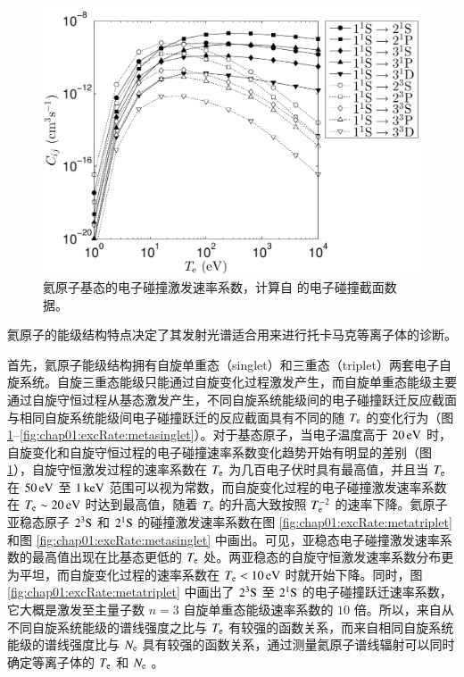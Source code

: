 \begin{figure}
  \centering
  \includegraphics[height=0.35\textheight]{excRate-from-1.pdf}
  \caption{氦原子基态的电子碰撞激发速率系数，计算自  的电子碰撞截面数据。}
  \label{fig:chap01:excRate:gs}
\end{figure}

氦原子的能级结构特点决定了其发射光谱适合用来进行托卡马克等离子体的诊断。

首先，氦原子能级结构拥有自旋单重态（singlet）和三重态（triplet）两套电子自旋系统。自旋三重态能级只能通过自旋变化过程激发产生，而自旋单重态能级主要通过自旋守恒过程从基态激发产生，不同自旋系统能级间的电子碰撞跃迁反应截面与相同自旋系统能级间电子碰撞跃迁的反应截面具有不同的随 $T_{\rm e}$ 的变化行为（图 \ref{fig:chap01:excRate:gs}--\ref{fig:chap01:excRate:metasinglet}）。对于基态原子，当电子温度高于 $20\,{\rm eV}$ 时，自旋变化和自旋守恒过程的电子碰撞速率系数变化趋势开始有明显的差别（图 \ref{fig:chap01:excRate:gs}），自旋守恒激发过程的速率系数在 $T_{\rm e}$ 为几百电子伏时具有最高值，并且当 $T_{\rm e}$ 在 $50\,{\rm eV}$ 至 $1\,{\rm keV}$ 范围可以视为常数，而自旋变化过程的电子碰撞激发速率系数在 $T_{\rm e}\sim 20\,{\rm eV}$ 时达到最高值，随着 $T_{\rm e}$ 的升高大致按照 $T_{\rm e}^{-2}$ 的速率下降。氦原子亚稳态原子 $2^3{\rm S}$ 和 $2^1{\rm S}$ 的碰撞激发速率系数在图 \ref{fig:chap01:excRate:metatriplet} 和图 \ref{fig:chap01:excRate:metasinglet} 中画出。可见，亚稳态电子碰撞激发速率系数的最高值出现在比基态更低的 $T_{\rm e}$ 处。两亚稳态的自旋守恒激发速率系数分布更为平坦，而自旋变化过程的速率系数在 $T_{\rm e}<10\,{\rm eV}$ 时就开始下降。同时，图 \ref{fig:chap01:excRate:metatriplet} 中画出了 $2^3{\rm S}$ 至 $2^1{\rm S}$ 的电子碰撞跃迁速率系数，它大概是激发至主量子数 $n=3$ 自旋单重态能级速率系数的 $10$ 倍。所以，来自从不同自旋系统能级的谱线强度之比与 $T_{\rm e}$ 有较强的函数关系，而来自相同自旋系统能级的谱线强度比与 $N_{\rm e}$ 具有较强的函数关系，通过测量氦原子谱线辐射可以同时确定等离子体的 $T_{\rm e}$ 和 $N_{\rm e}$ 。

